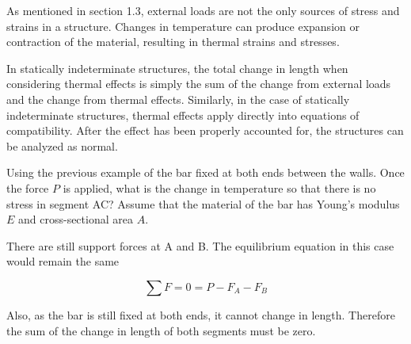 \documentclass[
fontsize=10pt,
a4paper,
twosides=false,
open=any,
svgnames,
]{kaobook} %
\begin{document}
As mentioned in section 1.3, external loads are not the only sources of stress and strains in a structure. Changes in temperature can produce expansion or contraction of the material, resulting in thermal strains and stresses.

In statically indeterminate structures, the total change in length when considering thermal effects is simply the sum of the change from external loads and the change from thermal effects. Similarly, in the case of statically indeterminate structures, thermal effects apply directly into equations of compatibility. After the effect has been properly accounted for, the structures can be analyzed as normal.

\begin{example}
  Using the previous example of the bar fixed at both ends between the walls. Once the force $P$ is applied, what is the change in temperature so that there is no stress in segment AC? Assume that the material of the bar has Young’s modulus $E$ and cross-sectional area $A$.

  \begin{figure}[H]
    \centering
  \end{figure}

  There are still support forces at A and B. The equilibrium equation in this case would remain the same

  \[\sum F  = 0 = P - {F_A} - {F_B}\]

  Also, as the bar is still fixed at both ends, it cannot change in length. Therefore the sum of the change in length of both segments must be zero.


\end{example}
\end{document}
